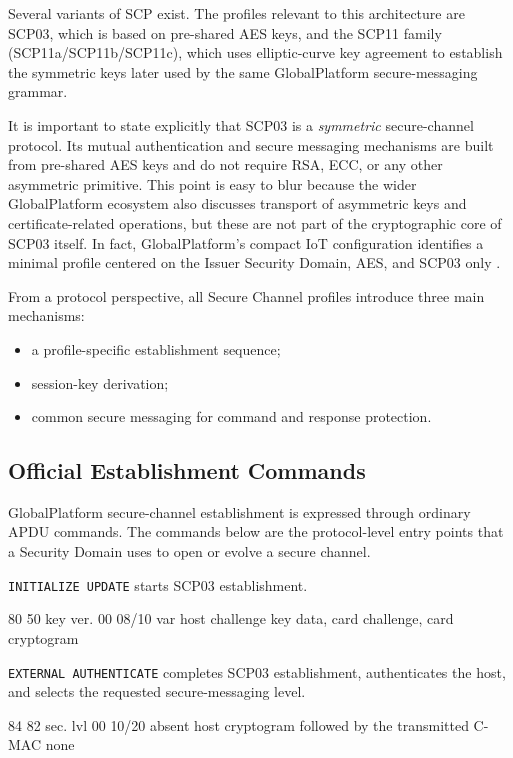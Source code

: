 Several variants of SCP exist. The profiles relevant to this architecture are
SCP03, which is based on pre-shared AES keys, and the SCP11 family
(SCP11a/SCP11b/SCP11c), which uses elliptic-curve key agreement to establish
the symmetric keys later used by the same GlobalPlatform secure-messaging
grammar.

It is important to state explicitly that SCP03 is a \emph{symmetric}
secure-channel protocol. Its mutual authentication and secure messaging
mechanisms are built from pre-shared AES keys and do not require RSA, ECC, or
any other asymmetric primitive. This point is easy to blur because the wider
GlobalPlatform ecosystem also discusses transport of asymmetric keys and
certificate-related operations, but these are not part of the cryptographic
core of SCP03 itself. In fact, GlobalPlatform's compact IoT configuration
identifies a minimal profile centered on the Issuer Security Domain, AES, and
SCP03 only \cite{gp-compact-iot}.

From a protocol perspective, all Secure Channel profiles introduce three main
mechanisms:
\begin{itemize}
\item a profile-specific establishment sequence;
\item session-key derivation;
\item common secure messaging for command and response protection.
\end{itemize}

\subsection{Official Establishment Commands}

GlobalPlatform secure-channel establishment is expressed through ordinary APDU
commands. The commands below are the protocol-level entry points that a
Security Domain uses to open or evolve a secure channel.

\texttt{INITIALIZE UPDATE} starts SCP03 establishment.

\apdudesc
{80}
{50}
{key ver.}
{00}
{08/10}
{var}
{host challenge}
{key data, card challenge, card cryptogram}

\texttt{EXTERNAL AUTHENTICATE} completes SCP03 establishment, authenticates
the host, and selects the requested secure-messaging level.

\apdudesc
{84}
{82}
{sec. lvl}
{00}
{10/20}
{absent}
{host cryptogram followed by the transmitted C-MAC}
{none}

